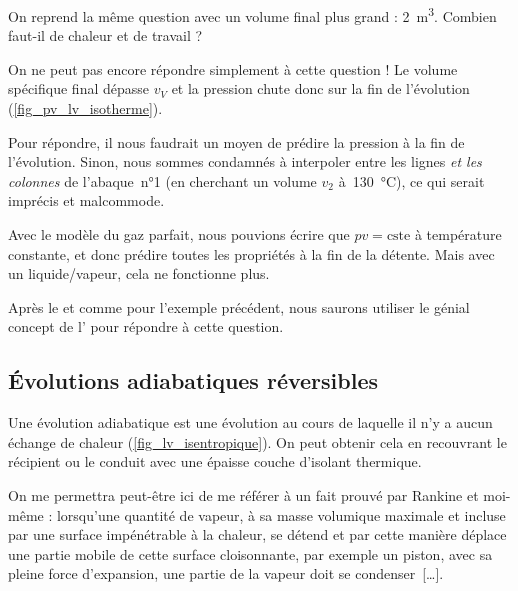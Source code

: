 			
			\begin{anexample}
			
			On reprend la même question avec un volume final plus grand : \SI{2}{\metre\cubed}. Combien faut-il de chaleur et de travail ?
					
				\begin{answer}
				On ne peut pas encore répondre simplement à cette question ! Le volume spécifique final dépasse $v_V$ et la pression chute donc sur la fin de l’évolution (\cref{fig_pv_lv_isotherme}).
				
				Pour répondre, il nous faudrait un moyen de prédire la pression à la fin de l’évolution. Sinon, nous sommes condamnés à interpoler entre les lignes \emph{et les colonnes} de l’abaque~n°1 (en cherchant un volume $v_2$ à~\SI{130}{\degreeCelsius}), ce qui serait imprécis et malcommode.
				
				\begin{remark}Avec le modèle du gaz parfait, nous pouvions écrire que $p v = \text{cste}$ à température constante, et donc prédire toutes les propriétés à la fin de la détente. Mais avec un liquide/vapeur, cela ne fonctionne plus.\end{remark}
				\begin{remark}Après le \courshuitshort et comme pour l’exemple précédent, nous saurons utiliser le génial concept de l’ pour répondre à cette question.\end{remark}\end{answer}
			\end{anexample}




	\subsection{Évolutions adiabatiques réversibles}
		\label{ch_lv_isentropiques}

		Une évolution adiabatique est une évolution au cours de laquelle il n’y a aucun échange de chaleur (\cref{fig_lv_isentropique}). On peut obtenir cela en recouvrant le récipient ou le conduit avec une épaisse couche d’isolant thermique.
		
		On me permettra peut-être ici de me référer à un fait prouvé par Rankine et moi-même : lorsqu’une quantité de vapeur, à sa masse volumique maximale et incluse par une surface impénétrable à la chaleur, se détend et par cette manière déplace une partie mobile de cette surface cloisonnante, par exemple un piston, avec sa pleine force d’expansion, une partie de la vapeur doit se condenser~[…].
		

